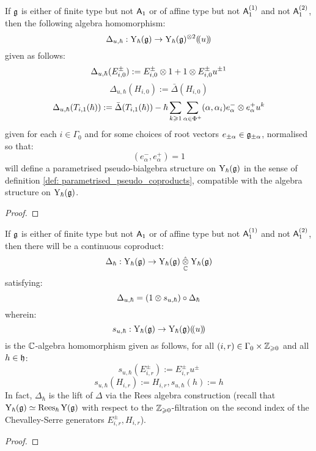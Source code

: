            \begin{theorem} \label{theorem: parametrised_pseudo_coproduct_on_formal_yangians}
                If $\mathfrak{g}$ is either of finite type but not $\mathsf{A}_1$ or of affine type but not $\mathsf{A}_1^{(1)}$ and not $\mathsf{A}_1^{(2)}$, then the following algebra homomorphism:
                    $$\Delta_{u, \hbar}: \rmY_{\hbar}(\g) \to \rmY_{\hbar}(\g)^{\tensor 2}(\!(u)\!)$$
                given as follows:
                    $$\Delta_{u, \hbar}(E_{i, 0}^{\pm}) := E_{i, 0}^{\pm} \tensor 1 + 1 \tensor E_{i, 0}^{\pm} u^{\pm 1}$$
                    $$\Delta_{u, \hbar}(H_{i, 0}) := \bar{\Delta}(H_{i, 0})$$
                    $$\Delta_{u, \hbar}(T_{i, 1}(\hbar)) := \bar{\Delta}(T_{i, 1}(\hbar)) - \hbar \sum_{k \geq 1} \sum_{\alpha \in \Phi^+} (\alpha, \alpha_i) e_{\alpha}^- \tensor e_{\alpha}^+ u^k$$
                given for each $i \in \Gamma_0$ and for some choices of root vectors $e_{\pm\alpha} \in \mathfrak{g}_{\pm\alpha}$, normalised so that:
                    $$(e_{\alpha}^-, e_{\alpha}^+) = 1$$
                will define a parametrised pseudo-bialgebra structure on $\mathrm{Y}_{\hbar}(\mathfrak{g})$ in the sense of definition \ref{def: parametrised_pseudo_coproducts}, compatible with the algebra structure on $\mathrm{Y}_{\hbar}(\mathfrak{g})$.
            \end{theorem}
                \begin{proof}
                    
                \end{proof}
            \begin{corollary}
                If $\mathfrak{g}$ is either of finite type but not $\mathsf{A}_1$ or of affine type but not $\mathsf{A}_1^{(1)}$ and not $\mathsf{A}_1^{(2)}$, then there will be a continuous coproduct:
                    $$\Delta_{\hbar}: \rmY_{\hbar}(\g) \to \rmY_{\hbar}(\g) \hattensor_{\bbC} \rmY_{\hbar}(\g)$$
                satisfying:
                    $$\Delta_{u, \hbar} = (1 \tensor s_{u, \hbar}) \circ \Delta_{\hbar}$$
                wherein:
                    $$s_{u, \hbar}: \mathrm{Y}_{\hbar}(\mathfrak{g}) \to \mathrm{Y}_{\hbar}(\mathfrak{g})(\!(u)\!)$$
                is the $\mathbb{C}$-algebra homomorphism given as follows, for all $(i, r) \in \Gamma_0 \x \Z_{\geq 0}$ and all $h \in \mathfrak{h}$:
                    $$s_{u, \hbar}(E_{i, r}^{\pm}) := E_{i, r}^{\pm} u^{\pm}$$
                    $$s_{u, \hbar}(H_{i, r}) := H_{i, r}, s_{u, \hbar}(h) := h$$
                In fact, $\Delta_{\hbar}$ is the lift of $\Delta$ via the Rees algebra construction (recall that $\mathrm{Y}_{\hbar}(\mathfrak{g}) \simeq \operatorname{Rees}_{\hbar} \mathrm{Y}(\mathfrak{g})$ with respect to the $\mathbb{Z}_{\geqslant 0}$-filtration on the second index of the Chevalley-Serre generators $E_{i, r}^{\pm}, H_{i, r}$).
            \end{corollary}
                \begin{proof}
                    
                \end{proof}

